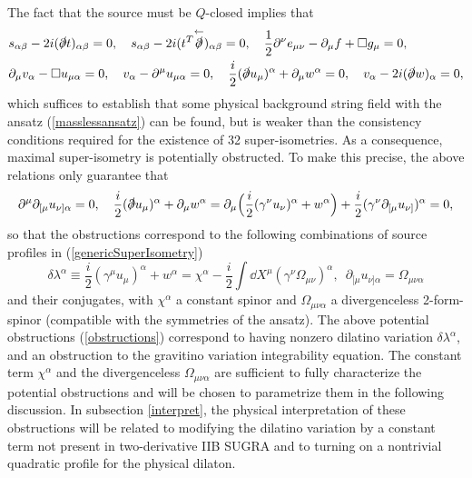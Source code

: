 \documentclass[12pt]{article}
\def\be{\begin{equation}}
\def\ee{\end{equation}}
\numberwithin{equation}{section}
\begin{document}
The fact that the source must be $Q$-closed implies that
\begin{equation}
	\begin{aligned}
    &s_{\alpha\beta}-2i(\slashed{\partial}t)_{\alpha\beta}=0,\quad s_{\alpha\beta}-2i(t^T\overset{\leftarrow}{\slashed{\partial}})_{\alpha\beta}=0, \quad \frac{1}{2} \partial^\nu e_{\mu \nu} - \partial_\mu f + \Box g_\mu = 0,\\
    &\partial_\mu v_{\alpha}-\Box u_{\mu\alpha}=0, \quad v_{\alpha}-\partial^{\mu}u_{\mu\alpha}=0, \quad \frac{i}{2}(\slashed{\partial}u_{\mu})^{\alpha}+\partial_{\mu}w^{\alpha}=0,\quad v_{\alpha}-2i(\slashed{\partial}w)_{\alpha}=0,
	\end{aligned}
\end{equation}
which suffices to establish that some physical background string field with the ansatz (\ref{masslessansatz}) can be found, but is weaker than the consistency conditions required for the existence of 32 super-isometries. As a consequence, maximal super-isometry is potentially obstructed. To make this precise, the above relations only guarantee that
\be
\begin{aligned}
	\partial^\mu \partial_{[\mu} u_{\nu] \alpha} = 0, \quad \frac{i}{2}(\slashed{\partial}u_{\mu})^{\alpha}+\partial_{\mu}w^{\alpha} = \partial_{\mu}\Big(\frac{i}{2}(\gamma^{\nu}u_{\nu})^{\alpha}+w^{\alpha}\Big)+\frac{i}{2}(\gamma^{\nu} \partial_{[\mu} u_{\nu]})^{\alpha} = 0,
\label{eqWithTwoForm}
\end{aligned}
\ee
so that the obstructions correspond to the following combinations of source profiles in (\ref{genericSuperIsometry})
\be
\delta \lambda^\alpha \equiv \frac{i}{2}(\gamma^{\mu}u_{\mu})^{\alpha}+w^{\alpha}=\chi^\alpha - \frac{i}{2} \int \dd X^\mu (\gamma^\nu \Omega_{\mu \nu})^\alpha, \,\,\, \partial_{[\mu} u_{\nu] \alpha} = \Omega_{\mu \nu \alpha}
\label{obstructions}
\ee
and their conjugates, with $\chi^\alpha$ a constant spinor and $\Omega_{\mu \nu \alpha}$ a divergenceless 2-form-spinor (compatible with the symmetries of the ansatz). The above potential obstructions (\ref{obstructions}) correspond to having nonzero dilatino variation $\delta \lambda^\alpha$, and an obstruction to the gravitino variation integrability equation. The constant term $\chi^\alpha$ and the divergenceless $\Omega_{\mu \nu \alpha}$ are sufficient to fully characterize the potential obstructions and will be chosen to parametrize them in the following discussion. In subsection \ref{interpret}, the physical interpretation of these obstructions will be related to modifying the dilatino variation by a constant term not present in two-derivative IIB SUGRA and to turning on a nontrivial quadratic profile for the physical dilaton.
\end{document}
